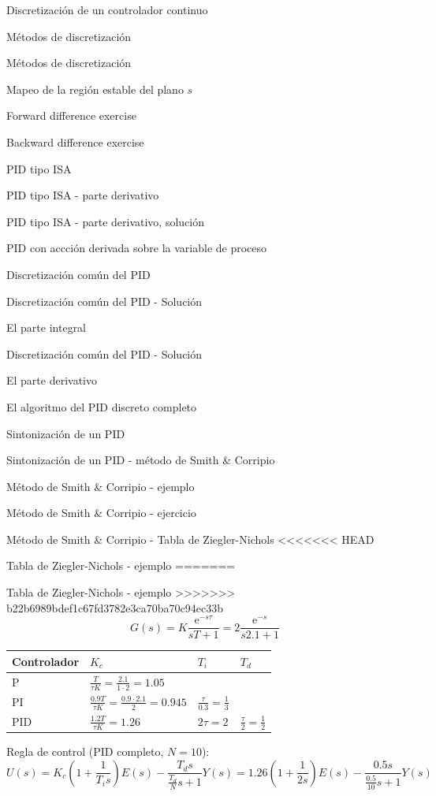 \documentclass[presentation,aspectratio=1610]{beamer}
\begin{document}
\begin{frame}[label={sec:org86d23da}]{Discretización de un controlador continuo}
\begin{frame}[label={sec:org3ca2082}]{Métodos de discretización}
\begin{frame}[label={sec:orga78cff2}]{Métodos de discretización}
\begin{frame}[label={sec:org28bff53}]{Mapeo de la región estable del plano \(s\)}
\begin{frame}[label={sec:org9bb57fa}]{Forward difference exercise}
\begin{frame}[label={sec:orgaf8c1b0}]{Backward difference exercise}
\begin{frame}[label={sec:orgb2215e6}]{PID tipo ISA}
\begin{frame}[label={sec:orga06296a}]{PID tipo ISA - parte derivativo}
\begin{frame}[label={sec:org978e098}]{PID tipo ISA - parte derivativo, solución}
\begin{frame}[label={sec:orgf3b475b}]{PID con accción derivada sobre la variable de proceso}
\begin{frame}[label={sec:org5c3258e}]{Discretización común del PID}
\begin{frame}[label={sec:org95130b5}]{Discretización común del PID - Solución}
\begin{block}{El parte integral}
\begin{frame}[label={sec:org35f72c2}]{Discretización común del PID - Solución}
\begin{block}{El parte derivativo}
\begin{frame}[label={sec:org34749bc}]{El algoritmo del PID discreto completo}
\begin{frame}[label={sec:orgaefa60b}]{Sintonización de un PID}
\begin{frame}[label={sec:orge6db74e}]{Sintonización de un PID - método de Smith \& Corripio}
\begin{frame}[label={sec:org7d7b902}]{Método de Smith \& Corripio - ejemplo}
\begin{frame}[label={sec:org7c57aa3}]{Método de Smith \& Corripio - ejercicio}
\begin{frame}[label={sec:org5d33a76}]{Método de Smith \& Corripio - Tabla de Ziegler-Nichols}
<<<<<<< HEAD
\begin{frame}[label={sec:org169be4a}]{Tabla de  Ziegler-Nichols - ejemplo}
=======
\begin{frame}[label={sec:orgd1988de}]{Tabla de  Ziegler-Nichols - ejemplo}
>>>>>>> b22b6989bdef1c67fd3782e3ca70ba70c94ec33b
\[ G(s) = K \frac{\mathrm{e}^{-s\tau}}{sT + 1} = 2 \frac{\mathrm{e}^{-s}}{s2.1 + 1} \]
   \begin{center}
   \setlength{\tabcolsep}{20pt}
   \renewcommand{\arraystretch}{1.5}
   \begin{tabular}{llll}
   Controlador & \(K_c\) & \(T_i\) & \(T_d\)\\
  \hline\hline
  P & \(\frac{T}{\tau K} = \frac{2.1}{1 \cdot 2} = 1.05\) &  & \\
  PI & \(\frac{0.9T}{\tau K} = \frac{0.9\cdot 2.1}{2}= 0.945\) & \(\frac{\tau}{0.3} = \frac{1}{3} \) & \\
  PID & \(\frac{1.2T}{\tau K} = 1.26 \) & \(2\tau=2\) & \(\frac{\tau}{2}=\frac{1}{2}\)\\
  \hline
\end{tabular}
\end{center}
Regla de control (PID completo, \(N=10\)):
\[ U(s) = K_c\left( 1 + \frac{1}{T_i s} \right) E(s) - \frac{T_d s}{\frac{T_d}{N} s + 1}Y(s)
           =  1.26\left( 1 + \frac{1}{2 s} \right) E(s) - \frac{0.5s}{\frac{0.5}{10} s + 1}Y(s)\]
\end{frame}



\end{frame}
\end{frame}
\end{frame}
\end{frame}
\end{frame}
\end{frame}
\end{frame}
\end{block}
\end{frame}
\end{block}
\end{frame}
\end{frame}
\end{frame}
\end{frame}
\end{frame}
\end{frame}
\end{frame}
\end{frame}
\end{frame}
\end{frame}
\end{frame}
\end{frame}
\end{document}

